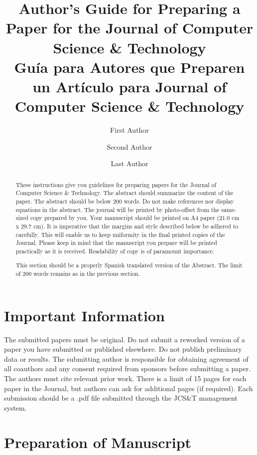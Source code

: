 \documentclass{jcst}
\title{Author's Guide for Preparing a Paper for the Journal of Computer Science \& Technology \\
\large Gu\'{i}a para Autores que Preparen un Art\'{i}culo para Journal of Computer Science \& Technology}
\author[1,2\orcid{0000-0002-1825-0097}]{First Author}
\author[2\orcid{0000-0002-1825-0097}]{Second Author}
\author[1\orcid{0000-0002-1825-0097}]{Last Author}
\affil[1]{University Department, University Name, Country \authorcr
\{firstauthor, lastauthor\}@mail.dom }
\affil[2]{Group, Company, Country  \authorcr
secondauthor@mail.dom}
\begin{document}
\maketitle

\begin{abstract}
These instructions give you guidelines for preparing papers for the Journal of Computer Science \& Technology. The abstract should summarize the  content of the paper. The abstract should be below 200 words. Do not make references nor display equations in the abstract. The journal will be printed   by photo-offset from the same-sized copy prepared by you. Your manuscript should be printed on A4 paper (21.0 cm x 29.7 cm). It is imperative that the margins and style described below be adhered to carefully. This will enable us to keep uniformity in the final printed copies of the Journal. Please
 keep in mind that the manuscript you prepare will be printed practically as it is received.  Readability of copy is of paramount importance.
\end{abstract}


\renewcommand{\abstractname}{Resumen}
\begin{abstract}
This section should be a properly Spanish translated version of the Abstract. The limit of 200 words remains as in the previous section.
\end{abstract}



\section{Important Information}

The submitted papers must be original. Do not submit a reworked version of a paper you
have submitted or published elsewhere. Do not publish preliminary data or results.
The submitting author is responsible for obtaining agreement of all coauthors and
any consent required from sponsors before submitting a paper. The authors must
 cite relevant prior work.
There is a limit of 15 pages for each paper in the Journal, but authors can ask for additional pages (if required). Each submission should
be a .pdf file submitted through the JCS\&T management system.


\section{Preparation of Manuscript}
\end{document}
